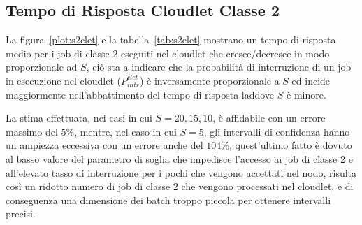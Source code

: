 \subsection{Tempo di Risposta Cloudlet Classe 2}
La figura~\ref{plot:s2clet} e la tabella~\ref{tab:s2clet} mostrano un tempo di
risposta medio per i job di classe 2 eseguiti nel cloudlet che cresce/decresce
in modo proporzionale ad $S$, ciò sta a indicare che la probabilità di
interruzione di un job in esecuzione nel cloudlet ($P_{intr}^{clet}$) è
inversamente proporzionale a $S$ ed incide maggiormente nell'abbattimento del
tempo di risposta laddove $S$ è minore.

La stima effettuata, nei casi in cui $S=20,15,10$, è affidabile con un errore
massimo del $5\%$, mentre, nel caso in cui $S=5$, gli intervalli di confidenza
hanno un ampiezza eccessiva con un errore anche del $104\%$, quest'ultimo fatto
è dovuto al basso valore del parametro di soglia che impedisce l'accesso ai job
di classe 2 e all'elevato tasso di interruzione per i pochi che vengono
accettati nel nodo, risulta così un ridotto numero di job di classe 2 che
vengono processati nel cloudlet, e di conseguenza una dimensione dei batch
troppo piccola per ottenere intervalli precisi.
